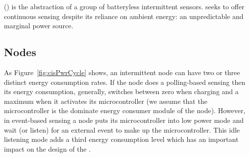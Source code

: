 \fullsys (\sys) is the abstraction of a group of batteryless intermittent sensors. \sys seeks to offer continuous sensing despite its reliance on ambient energy: an unpredictable and marginal power source. 

\subsection{\fullsys Nodes}
As Figure~\ref{fig:cisPwrCycle} shows, an intermittent node can have two or three distinct energy consumption rates. If the node does a polling-based sensing then its energy consumption, generally, switches between zero when charging and a maximum when it activates its microcontroller  (we assume that the microcontroller is the dominate energy consumer module of the node). However, in event-based sensing a node puts its microcontroller into low power mode and wait (or listen) for an external event to make up the microcontroller. This idle listening mode adds a third energy consumption level which has an important impact on the design of the \sys.
%
